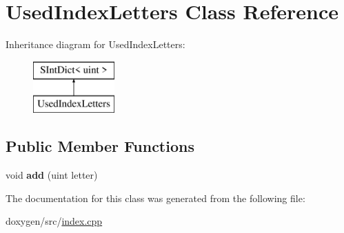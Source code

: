 \hypertarget{class_used_index_letters}{}\section{Used\+Index\+Letters Class Reference}
\label{class_used_index_letters}
Inheritance diagram for Used\+Index\+Letters\+:\begin{figure}[H]
\begin{center}
\leavevmode
\includegraphics[height=2.000000cm]{class_used_index_letters}
\end{center}
\end{figure}
\subsection*{Public Member Functions}
\begin{DoxyCompactItemize}
\item 
\mbox{\label{class_used_index_letters_aebf0da02a6643aa939acdba3b4fb8e16}} 
void {\bfseries add} (uint letter)
\end{DoxyCompactItemize}


The documentation for this class was generated from the following file\+:\begin{DoxyCompactItemize}
\item 
doxygen/src/\mbox{\hyperlink{index_8cpp}{index.\+cpp}}\end{DoxyCompactItemize}

